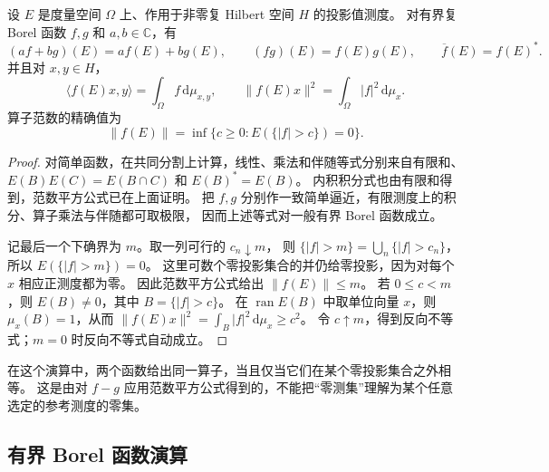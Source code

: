 \begin{proposition}
\label{b1:prop:29-borel-calculus}
设 \(E\) 是度量空间 \(\Omega\) 上、作用于非零复 Hilbert 空间 \(H\) 的投影值测度。
对有界复 Borel 函数 \(f,g\) 和 \(a,b\in\mathbb C\)，有
\[
 (af+bg)(E)=af(E)+bg(E),\qquad
 (fg)(E)=f(E)g(E),\qquad
 \overline f(E)=f(E)^*.
\]
并且对 \(x,y\in H\)，
\[
 \langle f(E)x,y\rangle=\int_\Omega f\,\mathrm{d}\mu_{x,y},\qquad
 \|f(E)x\|^2=\int_\Omega|f|^2\,\mathrm{d}\mu_x.
\]
算子范数的精确值为
\[
 \|f(E)\|=\inf\{c\geq0:E(\{|f|>c\})=0\}.
\]
\end{proposition}
\begin{proof}
对简单函数，在共同分割上计算，线性、乘法和伴随等式分别来自有限和、
\(E(B)E(C)=E(B\cap C)\) 和 \(E(B)^*=E(B)\)。
内积积分式也由有限和得到，范数平方公式已在上面证明。
把 \(f,g\) 分别作一致简单逼近，有限测度上的积分、算子乘法与伴随都可取极限，
因而上述等式对一般有界 Borel 函数成立。

记最后一个下确界为 \(m\)。取一列可行的 \(c_n\downarrow m\)，
则 \(\{|f|>m\}=\bigcup_n\{|f|>c_n\}\)，所以 \(E(\{|f|>m\})=0\)。
这里可数个零投影集合的并仍给零投影，因为对每个 \(x\) 相应正测度都为零。
因此范数平方公式给出 \(\|f(E)\|\leq m\)。
若 \(0\leq c<m\)，则 \(E(B)\ne0\)，其中 \(B=\{|f|>c\}\)。
在 \(\operatorname{ran}E(B)\) 中取单位向量 \(x\)，则 \(\mu_x(B)=1\)，从而
\(\|f(E)x\|^2=\int_B|f|^2\,\mathrm{d}\mu_x\geq c^2\)。
令 \(c\uparrow m\)，得到反向不等式；\(m=0\) 时反向不等式自动成立。
\end{proof}

在这个演算中，两个函数给出同一算子，当且仅当它们在某个零投影集合之外相等。
这是由对 \(f-g\) 应用范数平方公式得到的，不能把“零测集”理解为某个任意选定的参考测度的零集。

\subsection{有界 Borel 函数演算}
\label{b1:subsec:290403}

